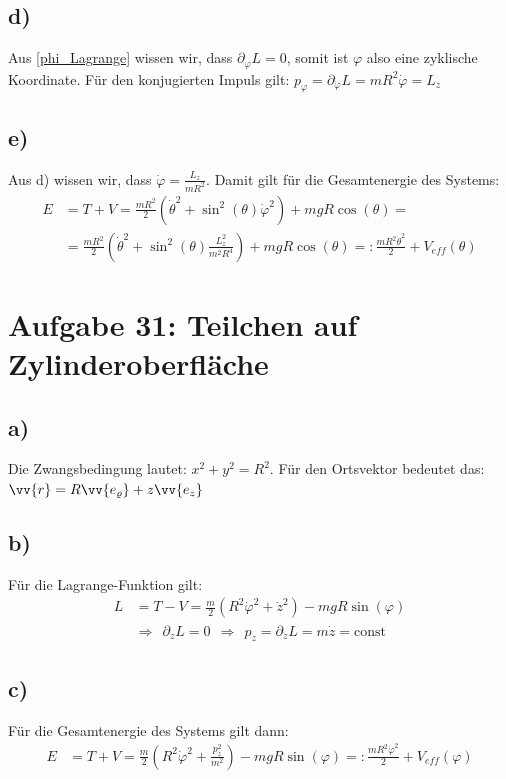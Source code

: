 \documentclass[a4paper,12pt]{article}
\begin{document}
\subsection*{d)} Aus \ref{phi_Lagrange} wissen wir, dass $\partial_{\varphi}L = 0$, somit ist $\varphi$ also eine zyklische Koordinate. Für den konjugierten Impuls gilt: $p_{\varphi} = \partial_{\dot{\varphi}}L = mR^2\dot{\varphi}=L_z$
\subsection*{e)} Aus d) wissen wir, dass $\dot{\varphi} = \frac{L_z}{mR^2}$. Damit gilt für die Gesamtenergie des Systems:
\begin{align*}
E&=T+V=\frac{mR^2}{2}(\dot{\theta}^2+\sin^2(\theta)\dot{\varphi}^2)+mgR\cos(\theta) =\\
&= \frac{mR^2}{2}(\dot{\theta}^2+\sin^2(\theta)\frac{L_z^2}{m^2R^4})+mgR\cos(\theta)=:\frac{mR^2\dot{\theta}^2}{2}+V_{eff}(\theta)
\end{align*}

\section*{Aufgabe 31: Teilchen auf Zylinderoberfläche}
\subsection*{a)} Die Zwangsbedingung lautet: $x^2+y^2=R^2$. Für den Ortsvektor bedeutet das: $\vv{r}=R\vv{e_{\varrho}}+z\vv{e_z}$
\subsection*{b)} Für die Lagrange-Funktion gilt:
\begin{align*}
L&=T-V=\frac{m}{2}(R^2\dot{\varphi}^2+\dot{z}^2)-mgR\sin(\varphi)\\
&\Rightarrow\ \ \partial_z L =0\ \ \Rightarrow\ \ p_z=\partial_{\dot{z}}L=m\dot{z}=\textrm{const}
\end{align*}
\subsection*{c)} Für die Gesamtenergie des Systems gilt dann:
\begin{align*}
E&=T+V=\frac{m}{2}(R^2\dot{\varphi}^2+\frac{p_z^2}{m^2})-mgR\sin(\varphi)=:\frac{mR^2\dot{\varphi}^2}{2}+V_{eff}(\varphi)
\end{align*}
\end{document}

